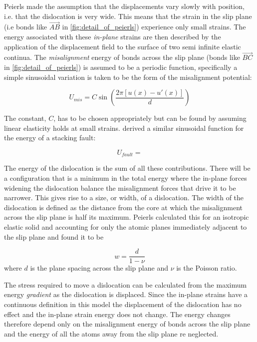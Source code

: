 Peierls made the assumption that the displacements vary slowly with position, i.e. that the dislocation is very wide. This means that the strain in the slip plane (i.e bonds like $\overrightarrow{AB}$ in \autoref{fig:detail_of_peierls}) experience only small strains. The energy associated with these \emph{in-plane} strains are then described  by the application of the displacement field to the surface of two semi infinite elastic continua. 
The \emph{misalignment} energy of bonds across the slip plane (bonds like $\overrightarrow{BC}$ in \autoref{fig:detail_of_peierls}) is assumed to be a periodic function, specifically a simple sinusoidal variation is taken to be the form of the misalignment potential:

\begin{equation}
U_{mis} = C \sin \left(\frac{2\pi [u(x) - u'(x)]}{d} \right)
\end{equation}

The constant, $C$, has to be chosen appropriately but can be found by assuming linear elasticity holds at small strains. \citet{Frenkel1926} derived a similar sinusoidal function for the energy of a stacking fault:

\begin{equation}
U_{fault} = 
\end{equation}

The energy of the dislocation is the sum of all these contributions. There will be a configuration that is a minimum in the total energy where the in-plane forces widening the dislocation balance the misalignment forces that drive it to be narrower. This gives rise to a size, or width, of a dislocation. The width of the dislocation is defined as the distance from the core at which the misalignment across the slip plane is half its maximum. Peierls calculated this for an isotropic elastic solid and accounting for only the atomic planes immediately adjacent to the slip plane and found it to be 

\begin{equation}
w = \frac{d}{1-\nu}
\label{eqn:width_isotropic}
\end{equation}
where $d$ is the plane spacing across the slip plane and $\nu$ is the Poisson ratio.

The stress required to move a dislocation can be calculated from the maximum energy \emph{gradient} as the dislocation is displaced. Since the in-plane strains have a continuous definition in this model the displacement of the dislocation has no effect and the in-plane strain energy does not change. The energy changes therefore depend only on the misalignment energy of bonds across the slip plane and the energy of all the atoms away from the slip plane re neglected.

